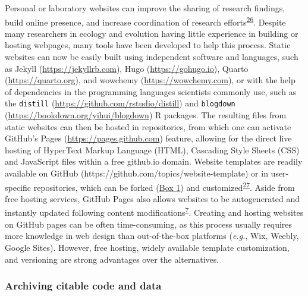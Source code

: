 Personal or laboratory websites can improve the sharing of research findings, build online presence, and increase coordination of research efforts\textsuperscript{\protect\hyperlink{ref-HiIPSSHV}{26}}.
Despite many researchers in ecology and evolution having little experience in building or hosting webpages, many tools have been developed to help this process.
Static websites can now be easily built using independent software and languages, such as Jekyll (\url{https://jekyllrb.com}), Hugo (\url{https://gohugo.io}), Quarto (\url{https://quarto.org}), and wowchemy (\url{https://wowchemy.com}), or with the help of dependencies in the programming languages scientists commonly use, such as the \texttt{distill} (\url{https://github.com/rstudio/distill}) and \texttt{blogdown} (\url{https://bookdown.org/yihui/blogdown}) R packages.
The resulting files from static websites can then be hosted in repositories, from which one can activate GitHub's Pages (\url{https://pages.github.com}) feature, allowing for the direct live hosting of HyperText Markup Language (HTML), Cascading Style Sheets (CSS) and JavaScript files within a free github.io domain.
Website templates are readily available on GitHub (https://github.com/topics/website-template) or in user-specific repositories, which can be forked (\protect\hyperlink{definitions}{Box 1}) and customized\textsuperscript{\protect\hyperlink{ref-MXxgZJ45}{27}}.
Aside from free hosting services, GitHub Pages also allows websites to be autogenerated and instantly updated following content modifications\textsuperscript{\protect\hyperlink{ref-RVetqmsg}{7}}.
Creating and hosting websites on GitHub pages can be often time-consuming, as this process usually requires more knowledge in web design than out-of-the-box platforms (\emph{e.g.}, Wix, Weebly, Google Sites).
However, free hosting, widely available template customization, and versioning are strong advantages over the alternatives.

\hypertarget{archiving-citable-code-and-data}{%
\subsubsection{Archiving citable code and data}\label{archiving-citable-code-and-data}}

